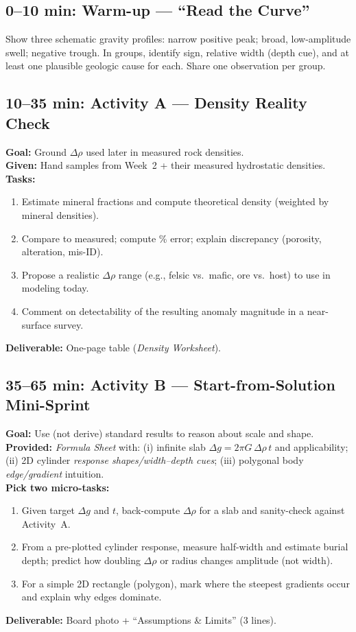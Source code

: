 \documentclass[11pt,a4paper]{article}
\begin{document}
\subsection*{0--10 min: Warm-up --- ``Read the Curve''}
Show three schematic gravity profiles: narrow positive peak; broad, low-amplitude swell; negative trough. In groups, identify sign, relative width (depth cue), and at least one plausible geologic cause for each. Share one observation per group.

\subsection*{10--35 min: Activity A --- Density Reality Check}
\textbf{Goal:} Ground $\Delta\rho$ used later in measured rock densities.\\
\textbf{Given:} Hand samples from Week~2 + their measured hydrostatic densities.\\
\textbf{Tasks:}
\begin{enumerate}
  \item Estimate mineral fractions and compute theoretical density (weighted by mineral densities).
  \item Compare to measured; compute \% error; explain discrepancy (porosity, alteration, mis-ID).
  \item Propose a realistic $\Delta\rho$ range (e.g., felsic vs.\ mafic, ore vs.\ host) to use in modeling today.
  \item Comment on detectability of the resulting anomaly magnitude in a near-surface survey.
\end{enumerate}
\textbf{Deliverable:} One-page table (\emph{Density Worksheet}).

\subsection*{35--65 min: Activity B --- Start-from-Solution Mini-Sprint}
\textbf{Goal:} Use (not derive) standard results to reason about scale and shape.\\
\textbf{Provided:} \emph{Formula Sheet} with: (i) infinite slab $\Delta g = 2\pi G\,\Delta\rho\,t$ and applicability; (ii) 2D cylinder \emph{response shapes/width--depth cues}; (iii) polygonal body \emph{edge/gradient} intuition.\\
\textbf{Pick two micro-tasks:}
\begin{enumerate}
  \item Given target $\Delta g$ and $t$, back-compute $\Delta\rho$ for a slab and sanity-check against Activity~A.
  \item From a pre-plotted cylinder response, measure half-width and estimate burial depth; predict how doubling $\Delta\rho$ or radius changes amplitude (not width).
  \item For a simple 2D rectangle (polygon), mark where the steepest gradients occur and explain why edges dominate.
\end{enumerate}
\textbf{Deliverable:} Board photo + ``Assumptions \& Limits'' (3 lines).
\end{document}

